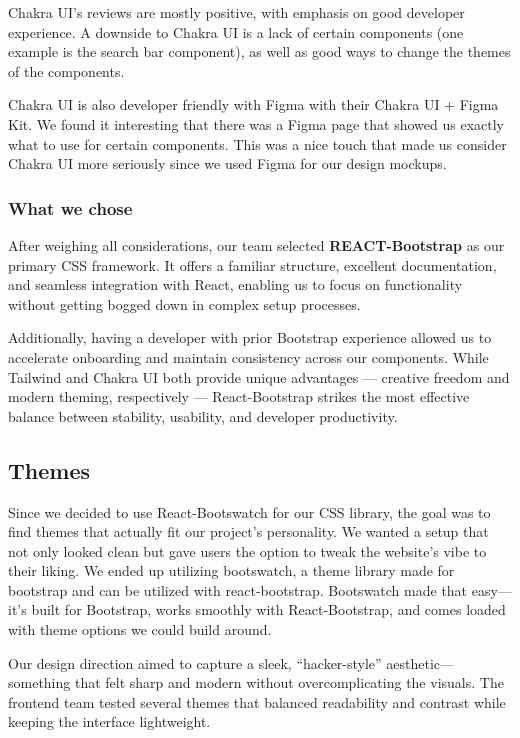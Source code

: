 \documentclass[12pt]{article}
\begin{document}
Chakra UI's reviews are mostly positive, with emphasis on good developer experience.
A downside to Chakra UI is a lack of certain components (one example is the search bar component), as well
as good ways to change the themes of the components.

Chakra UI is also developer friendly with Figma with their Chakra UI + Figma Kit.
We found it interesting that there was a Figma page that showed us exactly what to use for certain components.
This was a nice touch that made us consider Chakra UI more seriously since we used Figma for our design mockups.

\subsubsection{What we chose}
After weighing all considerations, our team selected \textbf{REACT-Bootstrap} as our primary CSS framework.
It offers a familiar structure, excellent documentation, and seamless integration with React,
enabling us to focus on functionality without getting bogged down in complex setup processes.

Additionally, having a developer with prior Bootstrap experience allowed us to accelerate onboarding
and maintain consistency across our components.
While Tailwind and Chakra UI both provide unique advantages — creative freedom and modern theming,
respectively — React-Bootstrap strikes the most effective balance between stability, usability, and developer productivity.

\subsection{Themes}
Since we decided to use React-Bootswatch for our CSS library, the goal was to find themes that actually fit our project’s personality.
We wanted a setup that not only looked clean but gave users the option to tweak the website’s vibe to their liking.
We ended up utilizing bootswatch, a theme library made for bootstrap and can be utilized with react-bootstrap.
Bootswatch made that easy—it’s built for Bootstrap, works smoothly with React-Bootstrap, and comes loaded with theme options we could build around.

Our design direction aimed to capture a sleek, “hacker-style” aesthetic—something that felt sharp and modern without overcomplicating the visuals.
The frontend team tested several themes that balanced readability and contrast while keeping the interface lightweight.
\end{document}
